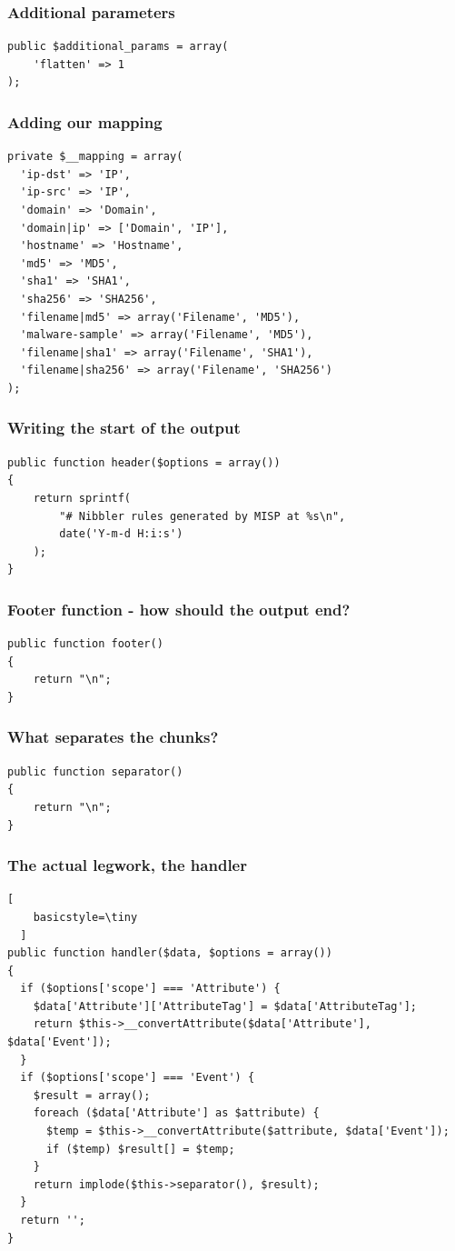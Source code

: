 \begin{frame}[fragile]
  \frametitle{Additional parameters}
  \begin{lstlisting}
public $additional_params = array(
    'flatten' => 1
);
  \end{lstlisting}
\end{frame}

\begin{frame}[fragile]
  \frametitle{Adding our mapping}
  \begin{lstlisting}
private $__mapping = array(
  'ip-dst' => 'IP',
  'ip-src' => 'IP',
  'domain' => 'Domain',
  'domain|ip' => ['Domain', 'IP'],
  'hostname' => 'Hostname',
  'md5' => 'MD5',
  'sha1' => 'SHA1',
  'sha256' => 'SHA256',
  'filename|md5' => array('Filename', 'MD5'),
  'malware-sample' => array('Filename', 'MD5'),
  'filename|sha1' => array('Filename', 'SHA1'),
  'filename|sha256' => array('Filename', 'SHA256')
);
  \end{lstlisting}
\end{frame}

\begin{frame}[fragile]
  \frametitle{Writing the start of the output}
  \begin{lstlisting}
public function header($options = array())
{
    return sprintf(
        "# Nibbler rules generated by MISP at %s\n",
        date('Y-m-d H:i:s')
    );
}
  \end{lstlisting}
\end{frame}

\begin{frame}[fragile]
  \frametitle{Footer function - how should the output end?}
  \begin{lstlisting}
public function footer()
{
    return "\n";
}
  \end{lstlisting}
\end{frame}

\begin{frame}[fragile]
  \frametitle{What separates the chunks?}
  \begin{lstlisting}
public function separator()
{
    return "\n";
}
  \end{lstlisting}
\end{frame}

\begin{frame}[fragile]
  \frametitle{The actual legwork, the handler}
  \begin{lstlisting}[
    basicstyle=\tiny
  ]
public function handler($data, $options = array())
{
  if ($options['scope'] === 'Attribute') {
    $data['Attribute']['AttributeTag'] = $data['AttributeTag'];
    return $this->__convertAttribute($data['Attribute'], $data['Event']);
  }
  if ($options['scope'] === 'Event') {
    $result = array();
    foreach ($data['Attribute'] as $attribute) {
      $temp = $this->__convertAttribute($attribute, $data['Event']);
      if ($temp) $result[] = $temp;
    }
    return implode($this->separator(), $result);
  }
  return '';
}
  \end{lstlisting}
\end{frame}

